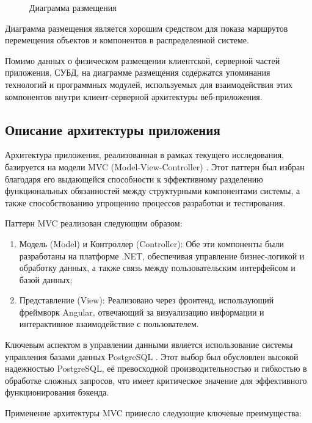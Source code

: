 \begin{figure}[ht]
\caption{Диаграмма размещения}
\label{place:image}
\end{figure}

Диаграмма размещения является хорошим средством для показа маршрутов перемещения объектов и компонентов в распределенной системе.

Помимо данных о физическом размещении клиентской, серверной частей приложения, СУБД, на диаграмме размещения содержатся упоминания технологий и программных модулей, используемых для взаимодействия этих компонентов внутри клиент-серверной архитектуры веб-приложения.

\subsection{Описание архитектуры приложения}

Архитектура приложения, реализованная в рамках текущего исследования, базируется на модели MVC (Model-View-Controller) \cite{kofman}. Этот паттерн был избран благодаря его выдающейся способности к эффективному разделению функциональных обязанностей между структурными компонентами системы, а также способствованию упрощению процессов разработки и тестирования.

Паттерн MVC реализован следующим образом:

\begin{enumerate}
    \item Модель (Model) и Контроллер (Controller): Обе эти компоненты были разработаны на платформе .NET, обеспечивая управление бизнес-логикой и обработку данных, а также связь между пользовательским интерфейсом и базой данных;
    \item Представление (View): Реализовано через фронтенд, использующий фреймворк Angular, отвечающий за визуализацию информации и интерактивное взаимодействие с пользователем.
\end{enumerate}

Ключевым аспектом в управлении данными является использование системы управления базами данных PostgreSQL \cite{kofman}. Этот выбор был обусловлен высокой надежностью PostgreSQL, её превосходной производительностью и гибкостью в обработке сложных запросов, что имеет критическое значение для эффективного функционирования бэкенда.

Применение архитектуры MVC принесло следующие ключевые преимущества:

